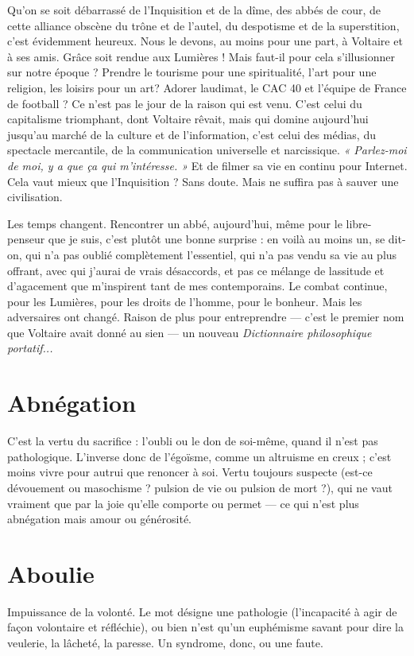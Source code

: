 Qu'on se soit débarrassé de l’Inquisition et de la dîme, des abbés de cour,
de cette alliance obscène du trône et de l’autel, du despotisme et de la superstition,
c’est évidemment heureux. Nous le devons, au moins pour une part, à
Voltaire et à ses amis. Grâce soit rendue aux Lumières ! Mais faut-il pour cela
s’illusionner sur notre époque ? Prendre le tourisme pour une spiritualité, l’art
pour une religion, les loisirs pour un art? Adorer laudimat, le CAC 40 et
l’équipe de France de football ? Ce n’est pas le jour de la raison qui est venu.
C’est celui du capitalisme triomphant, dont Voltaire rêvait, mais qui domine
aujourd’hui jusqu’au marché de la culture et de l'information, c’est celui des
médias, du spectacle mercantile, de la communication universelle et narcissique.
{\it « Parlez-moi de moi, y a que ça qui m'intéresse. »} Et de filmer sa vie en
continu pour Internet. Cela vaut mieux que l’Inquisition ? Sans doute. Mais
ne suffira pas à sauver une civilisation.

Les temps changent. Rencontrer un abbé, aujourd’hui, même pour le libre-penseur
que je suis, c’est plutôt une bonne surprise : en voilà au moins un, se
dit-on, qui n’a pas oublié complètement l'essentiel, qui n’a pas vendu sa vie au
plus offrant, avec qui j'aurai de vrais désaccords, et pas ce mélange de lassitude
et d’agacement que m'inspirent tant de mes contemporains. Le combat
continue, pour les Lumières, pour les droits de l’homme, pour le bonheur.
Mais les adversaires ont changé. Raison de plus pour entreprendre — c'est le
premier nom que Voltaire avait donné au sien — un nouveau {\it Dictionnaire philosophique
portatif...}

\section{Abnégation}
C’est la vertu du sacrifice : l'oubli ou le don de soi-même,
quand il n’est pas pathologique. L’inverse donc de l’égoïsme,
comme un altruisme en creux ; c’est moins vivre pour autrui que renoncer à soi.
Vertu toujours suspecte (est-ce dévouement ou masochisme ? pulsion de vie ou
pulsion de mort ?), qui ne vaut vraiment que par la joie qu’elle comporte ou
permet — ce qui n’est plus abnégation mais amour ou générosité.

\section{Aboulie}
Impuissance de la volonté. Le mot désigne une pathologie (l'incapacité
à agir de façon volontaire et réfléchie), ou bien n’est
qu’un euphémisme savant pour dire la veulerie, la lâcheté, la paresse. Un syndrome,
donc, ou une faute.

